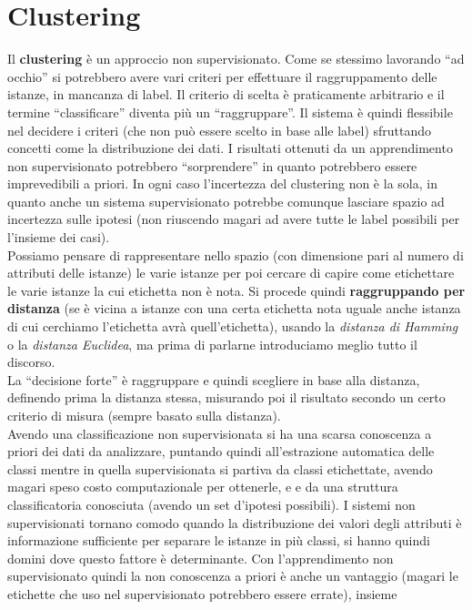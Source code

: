 \chapter{Clustering}
Il \textbf{clustering} è un approccio non supervisionato. Come se stessimo
lavorando ``ad occhio'' si potrebbero avere vari criteri per effettuare il
raggruppamento delle istanze, in mancanza di label. Il criterio di scelta è
praticamente arbitrario e il termine ``classificare'' diventa più un
``raggruppare''. Il sistema è quindi flessibile nel decidere i criteri (che non
può essere scelto in base alle label) sfruttando concetti come la distribuzione
dei dati. I risultati ottenuti da un apprendimento
non supervisionato potrebbero ``sorprendere'' in quanto potrebbero essere
imprevedibili a priori. In ogni caso l'incertezza del clustering non è la sola,
in quanto anche un sistema supervisionato potrebbe comunque lasciare spazio ad
incertezza sulle ipotesi (non riuscendo magari ad avere tutte le label possibili
per l'insieme dei casi).\\ 
Possiamo pensare di rappresentare nello spazio (con dimensione pari al numero di
attributi delle istanze) le varie istanze per poi cercare di capire come
etichettare le varie istanze la cui etichetta non è nota. Si procede quindi
\textbf{raggruppando per distanza} (se è vicina a istanze con una certa
etichetta nota uguale anche istanza di cui cerchiamo l'etichetta avrà
quell'etichetta), usando la \textit{distanza di Hamming} o la \textit{distanza
  Euclidea}, ma prima di parlarne introduciamo meglio tutto il discorso. \\
La ``decisione forte'' è raggruppare e quindi scegliere in base alla distanza,
definendo prima la distanza stessa, misurando poi il risultato secondo un certo
criterio di misura (sempre basato sulla distanza).\\
Avendo una classificazione non supervisionata si ha una scarsa conoscenza a
priori dei dati da analizzare, puntando quindi all'estrazione automatica delle
classi mentre in quella supervisionata si partiva da classi etichettate, avendo
magari speso costo computazionale per ottenerle, e e da una struttura
classificatoria conosciuta (avendo un set d'ipotesi possibili). I sistemi non
supervisionati tornano comodo quando la distribuzione dei valori degli attributi
è informazione sufficiente per separare le istanze in più classi, si hanno
quindi domini dove questo fattore è determinante. Con l'apprendimento non
supervisionato quindi la non conoscenza a priori è anche un vantaggio (magari le
etichette che uso nel supervisionato potrebbero essere errate), insieme
